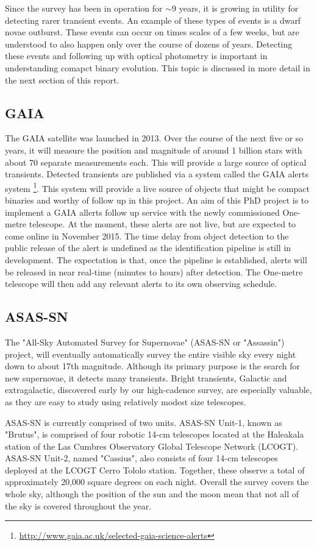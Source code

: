 \documentclass[a4paper,fleqn,usenatbib]{mnras}
\begin{document}
Since the survey has been in operation for $\sim 9$ years, it is growing in utility for detecting rarer transient events. An example of these types of events is a dwarf novae outburst. These events can occur on times scales of a few weeks, but are understood to also happen only over the course of dozens of years. Detecting these events and following up with optical photometry is important in understanding comapct binary evolution. This topic is discussed in more detail in the next section of this report. 

\subsection{GAIA}
The GAIA satellite was launched in 2013. Over the course of the next five or so years, it will measure the position and magnitude of around 1 billion stars with about 70 separate measurements each. This will provide a large source of optical transients. Detected transients are published via a system called the GAIA alerts system \footnote{\url{http://www.gaia.ac.uk/selected-gaia-science-alerts}}. This system will provide a live source of objects that might be compact binaries and worthy of follow up in this project. An aim of this PhD project is to implement a GAIA allerts follow up service with the newly commissioned One-metre telescope.  At the moment, these alerts are not live, but are expected to come online in November 2015. The time delay from object detection to the public release of the alert is undefined as the identification pipeline is still in development. The expectation is that, once the pipeline is established, alerts will be released in near real-time (minutes to hours) after detection. The One-metre telescope will then add any relevant alerts to its own observing schedule.  

\subsection{ASAS-SN}
The "All-Sky Automated Survey for Supernovae" (ASAS-SN or "Assassin") project, will eventually automatically survey the entire visible sky every night down to about 17th magnitude. Although its primary purpose is the search for new supernovae, it detects many transients.  Bright transients, Galactic and extragalactic, discovered early by our high-cadence survey, are especially valuable, as they are easy to study using relatively modest size telescopes.

ASAS-SN is currently comprised of two units. ASAS-SN Unit-1, known as "Brutus", is comprised of four robotic 14-cm telescopes located at the Haleakala station of the Las Cumbres Observatory Global Telescope Network (LCOGT). ASAS-SN Unit-2, named "Cassius", also consists of four 14-cm telescopes deployed at the LCOGT Cerro Tololo station. Together, these observe a total of approximately 20,000 square degrees on each night. Overall the survey covers the whole sky, although the position of the sun and the moon mean that not all of the sky is covered throughout the year. 
\end{document}
